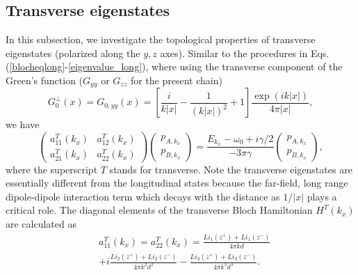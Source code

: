\documentclass[aps,pra,reprint,groupedaddress,nofootinbib,longbibliography,showpacs]{revtex4-1}
\begin{document}

\subsection{Transverse eigenstates}
In this subsection, we investigate the topological properties of transverse eigenstates (polarized along the $y,z$ axes). Similar to the procedures in Eqs.(\ref{blocheqlong}-\ref{eigenvalue_long}), where using the transverse component of the Green's function ($G_{yy}$ or $G_{zz}$ for the present chain) 
\begin{equation}
G_{0}^{\bot}(x)=G_{0,yy}(x)=[\frac{i}{k|x|}-\frac{1}{(k|x|)^2}+1]\frac{\exp{(ik|x|)}}{4\pi |x|},
\end{equation}
we have
\begin{equation}\label{eigenvalue_trans}
\left(\begin{matrix}
a_{11}^{T}(k_x) & a_{12}^{T}(k_x)\\
a_{21}^{T}(k_x) & a_{22}^{T}(k_x)
\end{matrix}\right)\left(\begin{matrix}p_{A,k_x}\\p_{B,k_x}\end{matrix}\right)=\frac{E_{k_x}-\omega_0 + i \gamma/2}{-3\pi\gamma}\left(\begin{matrix}p_{A,k_x}\\p_{B,k_x}\end{matrix}\right),
\end{equation}
where the superscript $T$ stands for transverse. Note the transverse eigenstates are essentially different from the longitudinal states because the far-field, long range dipole-dipole interaction term which decays with the distance as $1/|x|$ plays a critical role. The diagonal elements of the transverse Bloch Hamiltonian $H^T(k_x)$ are calculated as
\begin{equation}
\begin{split}
&a_{11}^{T}(k_x)=a_{22}^{T}(k_x)=\frac{Li_1(z^+)+Li_1(z^-)}{4\pi kd}\\&+i\frac{Li_2(z^+)+Li_2(z^-)}{4\pi k^2d^2}-\frac{Li_3(z^+)+Li_3(z^-)}{4\pi k^3d^3}.
\end{split}
\end{equation}
\end{document}
